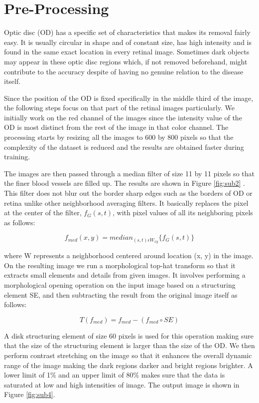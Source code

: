 \documentclass[12pt]{report}
\begin{document}
\section{Pre-Processing}

Optic disc (OD) has a specific set of characteristics that makes its removal fairly easy. It is usually circular in shape and of constant size, has high intensity and is found in the same exact location in every retinal image. Sometimes dark objects may appear in these optic disc regions which, if not removed beforehand, might contribute to the accuracy despite of having no genuine relation to the disease itself.

\noindent Since the position of the OD is fixed specifically in the middle third of the image, the following steps focus on that part of the retinal images particularly. We initially work on the red channel of the images since the intensity value of the OD is most distinct from the rest of the image in that color channel. The processing starts by resizing all the images to 600 by 800 pixels so that the complexity of the dataset is reduced and the results are obtained faster during training. 

\noindent The images are then passed through a median filter of size 11 by 11 pixels so that the finer blood vessels are filled up. The results are shown in Figure \ref{fig:sub2} . This filter does not blur out the border sharp edges such as the borders of OD or retina unlike other neighborhood averaging filters. It basically replaces the pixel at the center of the filter, $f_G(s,t) $, with pixel values of all its neighboring pixels as follows:

$$ 
f_{med}(x,y) = median_{(s,t)\epsilon W_{xy}}\{f_G(s,t)\}
$$

\noindent where W represents a neighborhood centered around location (x, y) in the image. On the resulting image we run a morphological top-hat transform so that it extracts small elements and details from given images. It involves performing a morphological opening operation on the input image based on a structuring element SE, and then subtracting the result from the original image itself as follows:

$$
T(f_{med}) = f_{med} - (f_{med}\circ SE)
$$

\noindent A disk structuring element of size 60 pixels is used for this operation making sure that the size of the structuring element is larger than the size of the OD. We then perform contrast stretching on the image so that it enhances the overall dynamic range of the image making the dark regions darker and bright regions brighter. A lower limit of 1\% and an upper limit of 80\% makes sure that the data is saturated at low and high intensities of image. The output image is shown in Figure \ref{fig:sub4}. 
\end{document}
